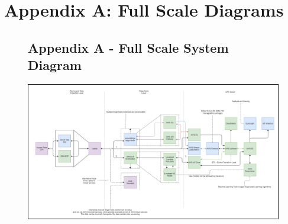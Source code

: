 \chapter{Appendix A: Full Scale Diagrams} 
\newpage


\begin{landscape}
\begin{figure}[ht]
\begin{minipage}{\linewidth}
\section{Appendix A - Full Scale System Diagram}

   \centering
    \includegraphics[width=1\linewidth]{pages/Chapter3/Chapter 3 images/block_system_diagram_v2.png}
    
    \label{appendix:full_scale_system_diagram}

\end{minipage}
\end{figure}
    \end{landscape}
    
